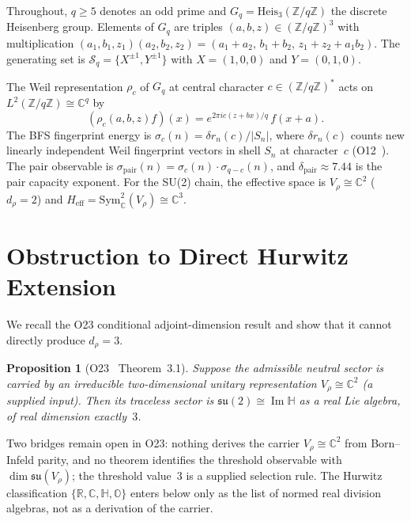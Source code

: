 \documentclass[11pt,a4paper]{article}
\newtheorem{proposition}[theorem]{Proposition}
\theoremstyle{definition}
\theoremstyle{remark}
\newcommand{\Heis}{\mathrm{Heis}}
\newcommand{\Sym}{\mathrm{Sym}}
\newcommand{\Vr}{V_{\rho}}
\newcommand{\dpair}{\delta_{\mathrm{pair}}}
\newcommand{\Gq}{G_q}
\newcommand{\Z}{\mathbb{Z}}
\newcommand{\C}{\mathbb{C}}
\newcommand{\R}{\mathbb{R}}
\newcommand{\HH}{\mathbb{H}}
\newcommand{\Sq}{\mathcal{S}_q}
\begin{document}
    Throughout, $q \geq 5$ denotes an odd prime and $\Gq = \Heis_3(\Z/q\Z)$ the discrete
    Heisenberg group.
    Elements of $\Gq$ are triples $(a, b, z) \in (\Z/q\Z)^3$ with multiplication
    $(a_1,b_1,z_1)(a_2,b_2,z_2) = (a_1+a_2,\, b_1+b_2,\, z_1+z_2+a_1 b_2)$.
    The generating set is $\Sq = \{X^{\pm 1}, Y^{\pm 1}\}$ with $X = (1,0,0)$ and $Y = (0,1,0)$.

    The Weil representation $\rho_c$ of $\Gq$ at central character $c \in (\Z/q\Z)^*$ acts on
    $L^2(\Z/q\Z) \cong \C^q$ by
    \begin{equation}
      (\rho_c(a,b,z)f)(x) = e^{2\pi i c(z + bx)/q}\, f(x + a).
    \end{equation}
    The BFS fingerprint energy is $\sigma_c(n) = \delta r_n(c) / |S_n|$, where $\delta r_n(c)$
    counts new linearly independent Weil fingerprint vectors in shell $S_n$ at character~$c$
    (O12~\cite{Beau2026a12}).
    The pair observable is $\sigma_{\mathrm{pair}}(n) = \sigma_c(n) \cdot \sigma_{q-c}(n)$, and
    $\dpair \approx 7.44$ is the pair capacity exponent.
    For the SU(2) chain, the effective space is $V_\rho \cong \C^2$ ($d_\rho = 2$) and
    $H_{\mathrm{eff}} = \Sym^2_\C(V_\rho) \cong \C^3$.

    \newpage
  \section{Obstruction to Direct Hurwitz Extension}
    \label{sec:obstruction}

    We recall the O23 conditional adjoint-dimension result and show that it cannot directly
    produce $d_\rho = 3$.

    \begin{proposition}[O23~\cite{Beau2026a27} Theorem~3.1]
      \label{prop:o23}
      Suppose the admissible neutral sector is carried by an irreducible two-dimensional
      unitary representation $\Vr \cong \C^2$ (a supplied input).
      Then its traceless sector is $\mathfrak{su}(2) \cong \operatorname{Im}\HH$
      as a real Lie algebra, of real dimension exactly~$3$.
    \end{proposition}

    Two bridges remain open in O23: nothing derives the carrier $\Vr \cong \C^2$ from
    Born--Infeld parity, and no theorem identifies the threshold observable with
    $\dim \mathfrak{su}(\Vr)$; the threshold value~$3$ is a supplied selection rule.
    The Hurwitz classification $\{\R, \C, \HH, \mathbb{O}\}$ enters below only as the list of
    normed real division algebras, not as a derivation of the carrier.
\end{document}

